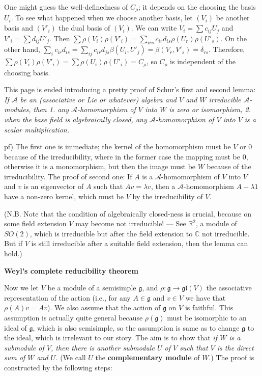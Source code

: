 \documentclass{article}
\newcommand{\ReR}{\mathbb{R}}
\newcommand{\CoC}{\mathbb{C}}
\newcommand{\lie}[1]{\mathfrak{#1}}
\begin{document}
One might guess the well-definedness of $C_\rho$; it depends on the choosing the basis $U_i$.
To see what happened when we choose another basis, let $(V_i)$ be another basis and $(V'_i)$ the dual basis of $(V_i)$.
We can write $V_i = \sum c_{ij} U_j$ and $V'_i = \sum d_{ij} U'_j$.
Then $\sum \rho(V_i) \rho(V'_i) = \sum_{irs} c_{ir} d_{is} \rho(U_r) \rho(U'_s)$.
On the other hand, $\sum_i c_{ir} d_{is} = \sum_{ij} c_{ir} d_{js} \beta(U_i, U'_j) = \beta(V_r, V'_s) = \delta_{rs}$.
Therefore, $\sum \rho(V_i) \rho(V'_i) = \sum \rho(U_i) \rho(U'_i) = C_\rho$, so $C_\rho$ is independent of the choosing basis.

This page is ended introducing a pretty proof of Schur's first and second lemma: \textit{If $\mathcal{A}$ be an (associative or Lie or whatever) algebra and $V$ and $W$ irreducible $\mathcal{A}$-modules, then 1. any $\mathcal{A}$-homomorphism of $V$ into $W$ is zero or isomorphism, 2. when the base field is algebraically closed, any $\mathcal{A}$-homomorphism of $V$ into $V$ is a scalar multiplication.}

pf) The first one is immediate; the kernel of the homomorphism must be $V$ or 0 because of the irreducibility, where in the former case the mapping must be 0, otherwise it is a monomorphism, but then the image must be $W$ because of the irreducibility.
The proof of second one: If $A$ is a $\mathcal{A}$-homomorphism of $V$ into $V$ and $v$ is an eigenvector of $A$ such that $Av = \lambda v$, then a $\mathcal{A}$-homomorphism $A - \lambda 1$ have a non-zero kernel, which must be $V$ by the irreducibility of $V$.

(N.B. Note that the condition of algebraically closed-ness is crucial, because on some field extension $V$ may become not irreducible! --- See $\ReR^2$, a module of $SO(2)$, which is irreducible but after the field extension to $\CoC$ not irreducible.
But if $V$ is still irreducible after a suitable field extension, then the lemma can hold.)

\newpage

\textbf{Weyl's complete reducibility theorem}

Now we let $V$ be a module of a semisimple $\lie{g}$, and $\rho : \lie{g} \to \lie{gl}(V)$ the associative representation of the action (i.e., for any $A \in \lie{g}$ and $v \in V$ we have that $\rho(A)v = Av$).
We also assume that the action of $\lie{g}$ on $V$ is faithful.
This assumption is actually quite general because $\rho(\lie{g})$ must be isomorphic to an ideal of $\lie{g}$, which is also semisimple, so the assumption is same as to change $\lie{g}$ to the ideal, which is irrelevant to our story.
The aim is to show that \textit{if $W$ is a submodule of $V$, then there is another submodule $U$ of $V$ such that $V$ is the direct sum of $W$ and $U$.}
(We call $U$ the \textbf{complementary module} of $W$.)
The proof is constructed by the following steps:
\end{document}
